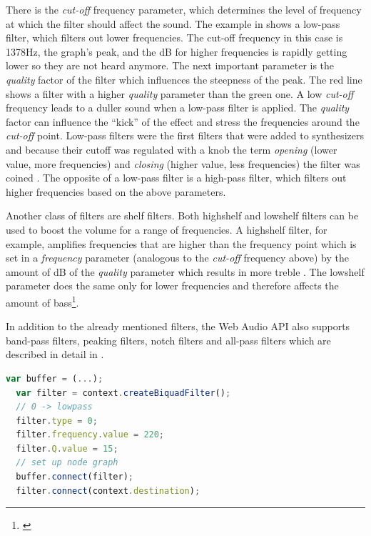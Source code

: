 There is the \emph{cut-off} frequency parameter, which determines the level of frequency at which the filter should affect the sound. The example in  shows a low-pass filter, which filters out lower frequencies. The cut-off frequency in this case is 1378Hz, the graph's peak, and the dB for higher frequencies is rapidly getting lower so they are not heard anymore. The next important parameter is the \emph{quality} factor of the filter which influences the steepness of the peak. The red line shows a filter with a higher \emph{quality} parameter than the green one. A low \emph{cut-off} frequency leads to a duller sound when a low-pass filter is applied. The \emph{quality} factor can influence the ``kick'' of the effect and stress the frequencies around the \emph{cut-off} point. Low-pass filters were the first filters that were added to synthesizers and because their cutoff was regulated with a knob the term \emph{opening} (lower value, more frequencies) and \emph{closing} (higher value, less frequencies) the filter was coined \cite[chapter: 2, Filter Types]{cannAnalogSynthesis}. The opposite of a low-pass filter is a high-pass filter, which filters out higher frequencies based on the above parameters.

Another class of filters are shelf filters. Both highshelf and lowshelf filters can be used to boost the volume for a range of frequencies. A highshelf filter, for example, amplifies frequencies that are higher than the frequency point which is set in a \emph{frequency} parameter (analogous to the \emph{cut-off} frequency above) by the amount of dB of the \emph{quality} parameter which results in more treble \cite[chapter: 6]{smus2013webaudio}. The lowshelf parameter does the same only for lower frequencies and therefore affects the amount of bass\footnote{\cite[chapter: 6]{smus2013webaudio}}.

In addition to the already mentioned filters, the Web Audio API also supports band-pass filters, peaking filters, notch filters and all-pass filters which are described in detail in \cite[The BiquadFilterNode Interface]{wilson2014webaudiospec}.

\begin{lstlisting}[language=JavaScript, caption=Applying a filter to a buffer, label=lst:webaudiofilter]
  var buffer = (...);
  var filter = context.createBiquadFilter();
  // 0 -> lowpass
  filter.type = 0;
  filter.frequency.value = 220;
  filter.Q.value = 15;
  // set up node graph
  buffer.connect(filter);
  filter.connect(context.destination);
\end{lstlisting}

